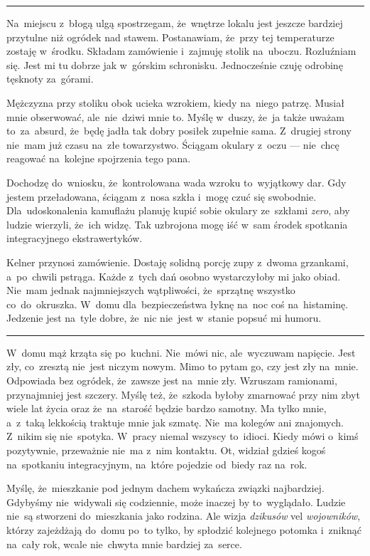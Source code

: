 \documentclass[9pt, a5paper]{memoir}
\begin{document}
\fancybreak{* \quad * \quad *}

Na~miejscu z~błogą ulgą spostrzegam, że~wnętrze lokalu jest jeszcze bardziej przytulne niż ogródek nad stawem. Postanawiam, że~przy tej temperaturze zostaję w~środku. Składam zamówienie i~zajmuję stolik na~uboczu. Rozluźniam się. Jest mi tu dobrze jak w~górskim schronisku. Jednocześnie czuję odrobinę tęsknoty za~górami.

Mężczyzna przy stoliku obok ucieka wzrokiem, kiedy na~niego patrzę. Musiał mnie obserwować, ale~nie~dziwi mnie to. Myślę w~duszy, że~ja także uważam to~za~absurd, że~będę jadła tak dobry posiłek zupełnie sama. Z~drugiej strony nie~mam już czasu na~złe towarzystwo. Ściągam okulary z~oczu --- nie~chcę reagować na~kolejne spojrzenia tego pana.

Dochodzę do~wniosku, że~kontrolowana wada wzroku to~wyjątkowy dar. Gdy jestem przeładowana, ściągam z~nosa szkła i~mogę czuć się swobodnie. Dla~udoskonalenia kamuflażu planuję kupić sobie okulary ze~szkłami \textit{zero}, aby ludzie wierzyli, że~ich widzę. Tak uzbrojona mogę iść w~sam środek spotkania integracyjnego ekstrawertyków.

Kelner przynosi zamówienie. Dostaję solidną porcję zupy z~dwoma grzankami, a~po~chwili pstrąga. Każde z~tych dań osobno wystarczyłoby mi jako obiad. Nie~mam jednak najmniejszych wątpliwości, że~sprzątnę wszystko co~do~okruszka. W~domu dla~bezpieczeństwa łyknę na~noc coś na~histaminę. Jedzenie jest na~tyle dobre, że~nic nie~jest w~stanie popsuć mi humoru.

\fancybreak{* \quad * \quad *}


W~domu mąż krząta się po~kuchni. Nie~mówi nic, ale~wyczuwam napięcie. Jest zły, co~zresztą nie~jest niczym nowym. Mimo to pytam go, czy jest zły na~mnie. Odpowiada bez ogródek, że~zawsze jest na~mnie zły. Wzruszam ramionami, przynajmniej jest szczery. Myślę też, że~szkoda byłoby zmarnować przy nim zbyt wiele lat życia oraz że~na~starość będzie bardzo samotny. Ma tylko mnie, a~z~taką lekkością traktuje mnie jak szmatę. Nie~ma kolegów ani znajomych. Z~nikim się nie~spotyka. W~pracy niemal wszyscy to~idioci. Kiedy mówi o~kimś pozytywnie, przeważnie nie~ma z~nim kontaktu. Ot, widział gdzieś kogoś na~spotkaniu integracyjnym, na~które pojedzie od~biedy raz na~rok.

Myślę, że~mieszkanie pod jednym dachem wykańcza związki najbardziej. Gdybyśmy nie~widywali się codziennie, może inaczej by to~wyglądało. Ludzie nie~są stworzeni do~mieszkania jako rodzina. Ale wizja \textit{dzikusów} vel \textit{wojowników}, którzy zajeżdżają do~domu po~to tylko, by spłodzić kolejnego potomka i~zniknąć na~cały rok, wcale nie~chwyta mnie bardziej za~serce.
\end{document}
